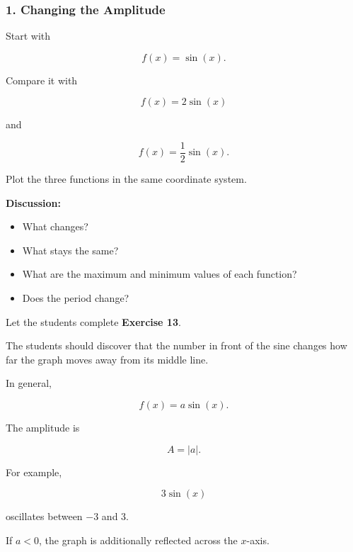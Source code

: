 \documentclass[a4paper,11pt]{article}
\begin{document}
\subsubsection*{1. Changing the Amplitude}

Start with

\begin{equation}
    f(x)=\sin(x).
\end{equation}

Compare it with

\begin{equation}
    f(x)=2\sin(x)
\end{equation}

and

\begin{equation}
    f(x)=\frac{1}{2}\sin(x).
\end{equation}

Plot the three functions in the same coordinate system.

\textbf{Discussion:}

\begin{itemize}
    \item What changes?
    \item What stays the same?
    \item What are the maximum and minimum values of each function?
    \item Does the period change?
\end{itemize}

Let the students complete \textbf{Exercise 13}.

The students should discover that the number in front of the sine
changes how far the graph moves away from its middle line.

In general,

\begin{equation}
    f(x)=a\sin(x).
\end{equation}

The amplitude is

\begin{equation}
    \boxed{A=|a|}.
\end{equation}

For example,

\begin{equation*}
    3\sin(x)
\end{equation*}

oscillates between $-3$ and $3$.

If $a<0$, the graph is additionally reflected across the $x$-axis.
\end{document}
